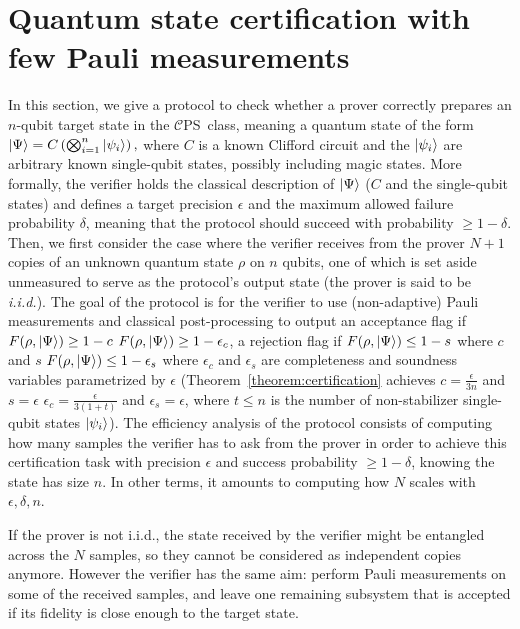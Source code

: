 \documentclass[a4paper,twocolumn,11pt,unpublished]{../../revision/quantumarticle}
\newcommand{\CEPS}{$\mathcal C$PS}
\providecommand{\DIFadd}[1]{{\protect\color{blue} \sf #1}} %
\providecommand{\DIFdel}[1]{{\protect\color{red} \scriptsize #1}} %
\providecommand{\DIFaddbegin}{} %
\providecommand{\DIFaddend}{} %
\providecommand{\DIFdelbegin}{} %
\providecommand{\DIFdelend}{} %
\begin{document}
%
%

\section{Quantum state certification with few Pauli measurements}
\label{section:certification}
In this section, we give a protocol to check whether a prover correctly prepares an $n$-qubit target state in the \CEPS\ class, meaning a quantum state of the form
        \(
        \ket{\Psi} = C\left(\bigotimes_{i=1}^n \ket{\psi_i}\right),
        \)
        where $C$ is a known Clifford circuit and the $\ket{\psi_i}$ are arbitrary known single-qubit states, possibly including magic states.
        More formally, 
%
%
the verifier holds the classical description of $\ket\Psi$ ($C$ and the single-qubit states) and defines a target precision $\epsilon$ and the maximum allowed failure probability $\delta$, meaning that the protocol should succeed with probability $\geq 1-\delta$. Then, we first consider the case where the verifier receives from the prover $N+1$ copies of an unknown quantum state $\rho$ on $n$ qubits, one of which is set aside unmeasured to serve as the protocol's output state (the prover is said to be \textit{i.i.d.}).
%
The goal of the protocol is for the verifier to use (non-adaptive) Pauli measurements and classical post-processing to output an acceptance flag if \DIFdelbegin \DIFdel{$F(\rho, \ket\Psi) \geq 1-c$}\DIFdelend \DIFaddbegin \DIFadd{$F(\rho, \ket\Psi) \geq 1-\epsilon_c$}\DIFaddend , a rejection flag if \DIFdelbegin \DIFdel{$F(\rho, \ket\Psi)\leq 1-s$ where $c$ and $s$ }\DIFdelend \DIFaddbegin \DIFadd{$F(\rho, \ket\Psi)\leq 1-\epsilon_s$ where $\epsilon_c$ and $\epsilon_s$ }\DIFaddend are completeness and soundness variables parametrized by $\epsilon$ (Theorem~\ref{theorem:certification} achieves \DIFdelbegin \DIFdel{$c=\frac{\epsilon}{3n}$ and $s=\epsilon$}\DIFdelend \DIFaddbegin \DIFadd{$\epsilon_c=\frac{\epsilon}{3(1+t)}$ and $\epsilon_s=\epsilon$, where $t\le n$ is the number of non-stabilizer single-qubit states $\ket{\psi_i}$}\DIFaddend ).
The efficiency analysis of the protocol consists of computing how many samples the verifier has to ask from the prover in order to achieve this certification task with precision $\epsilon$ and success probability $\geq1-\delta$, knowing the state has size $n$. In other terms, it amounts to computing how $N$ scales with $\epsilon, \delta, n$.

If the prover is not i.i.d., the state received by the verifier might be entangled across the $N$ samples, so they cannot be considered as independent copies anymore. However the verifier has the same aim: perform Pauli measurements on some of the received samples, and leave one remaining subsystem that is accepted if its fidelity is close enough to the target state.
\end{document}

